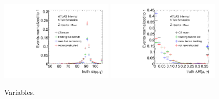 \begin{figure}[tp]
  \centering
  \includegraphics[width=0.48\textwidth]{figures/tauperformance/muonfakes_mlly}
  \includegraphics[width=0.48\textwidth]{figures/tauperformance/muonfakes_dR}
  \caption{Variables.}
  \label{fig:taus-muonfakes2}
\end{figure}


